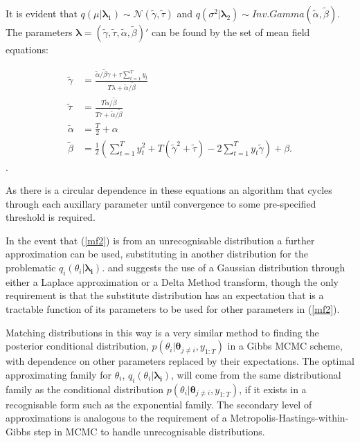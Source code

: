 \documentclass[12pt,a4paper]{article}%
\numberwithin{equation}{section}
\begin{document}
It is evident that $q(\mu | \boldsymbol{\lambda}_1) \sim \mathcal{N}(\tilde{\gamma}, \tilde{\tau})$ and $q(\sigma^2 | \boldsymbol{\lambda}_2) \sim Inv.Gamma(\tilde{\alpha}, \tilde{\beta})$. The parameters $\boldsymbol{\lambda} = (\tilde{\gamma}, \tilde{\tau}, \tilde{\alpha}, \tilde{\beta})'$ can be found by the set of mean field equations:

\begin{align}
\tilde{\gamma} &= \frac{\tilde{\alpha} / \tilde{\beta} \gamma + \tau \sum_{t=1}^{T} y_t} {T \lambda + \tilde{\alpha} / \tilde{\beta}} \label{mf5} \\ 
\tilde{\tau} &= \frac{T \tilde{\alpha} / \tilde{\beta}}{T \tau + \tilde{\alpha} / \tilde{\beta}} \label{mf6} \\
\tilde{\alpha} &= \frac{T}{2} + \alpha  \label{mf7} \\
\tilde{\beta} &= \frac{1}{2} \left(\sum_{t=1}^{T} y_t^2 + T(\tilde{\gamma}^2 + \tilde{\tau}) - 2 \sum_{t=1}^{T} y_t \tilde{\gamma} \right) + \beta. \label{mf8}
\end{align}.

As there is a circular dependence in these equations an algorithm that cycles through each auxillary parameter until convergence to some pre-specified threshold is required.

In the event that (\ref{mf2}) is from an unrecognisable distribution a further approximation can be used, substituting in another distribution for the problematic $q_i(\theta_i |\boldsymbol{\lambda_i}).$ \citet{Friston2006} and \citet{Wang2013} suggests the use of a Gaussian distribution through either a Laplace approximation or a Delta Method transform, though the only requirement is that the substitute distribution has an expectation that is a tractable function of its parameters to be used for other parameters in (\ref{mf2}). 

Matching distributions in this way is a very similar method to finding the posterior conditional distribution, $p(\theta_i | \boldsymbol{\theta}_{j \neq i}, y_{1:T})$ in a Gibbs MCMC scheme, with dependence on other parameters replaced by their expectations. The optimal approximating family for $\theta_i$, $q_i(\theta_i |\boldsymbol{\lambda_i})$, will come from the same distributional family as the conditional distribution $p(\theta_i | \boldsymbol{\theta}_{j \neq i}, y_{1:T})$, if it exists in a recognisable form such as the exponential family. The secondary level of approximations is analogous to the requirement of a Metropolis-Hastings-within-Gibbs step in MCMC to handle unrecognisable distributions.
\vspace{5mm}
\end{document}
